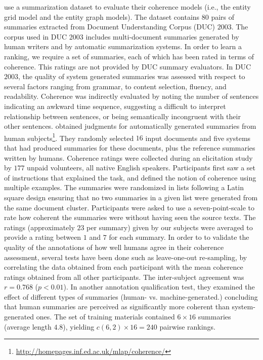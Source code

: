  use a summarization dataset to evaluate their coherence models (i.e., the entity grid model and the entity graph models).  
The dataset contains $80$ pairs of summaries extracted from Document Understanding Corpus (DUC) $2003$. 
The corpus used in DUC 2003 includes multi-document summaries generated by human writers and by automatic summarization systems. 
In order to learn a ranking, we require a set of summaries, each of which has been rated in terms of coherence. 
This ratings are not provided by DUC summary evaluators. 
In DUC $2003$, the quality of system generated summaries was assessed with respect to several factors ranging from grammar, to content selection, fluency, and readability. 
Coherence was indirectly evaluated by noting the number of sentences indicating an awkward time sequence, suggesting a difficult to interpret relationship between sentences, or being semantically incongruent with their other sentences. 
 obtained judgments for automatically generated summaries from human subjects\footnote{\url{http://homepages.inf.ed.ac.uk/mlap/coherence/}}.
They randomly selected $16$ input documents and five systems that had produced summaries for these documents, plus the reference summaries written by humans. 
Coherence ratings were collected during an elicitation study by $177$ unpaid volunteers, all native English speakers. 
Participants first saw a set of instructions that explained the task, and defined the notion of coherence using multiple examples. 
The summaries were randomized in lists following a Latin square design ensuring that no two summaries in a given list were generated from the same document cluster. 
Participants were asked to use a seven-point-scale to rate how coherent the summaries were without having seen the source texts. 
The ratings (approximately $23$ per summary) given by our subjects were averaged to provide a rating between $1$ and $7$ for each summary. 
In order to to validate the quality of the annotations of how well humans agree in their coherence assessment, several tests have been done such as leave-one-out re-sampling, by correlating the data obtained from each participant with the mean coherence ratings obtained from all other participants. 
The inter-subject agreement was $r = 0.768$ ($p < 0.01$). 
In another annotation qualification test, they examined the effect of different types of summaries (human- vs. machine-generated.) concluding that human summaries are perceived as significantly more coherent than system-generated ones. 
The set of training materials contained $6 × 16$ summaries (average length $4.8$), yielding $c(6,2) × 16 = 240$ pairwise rankings. 
